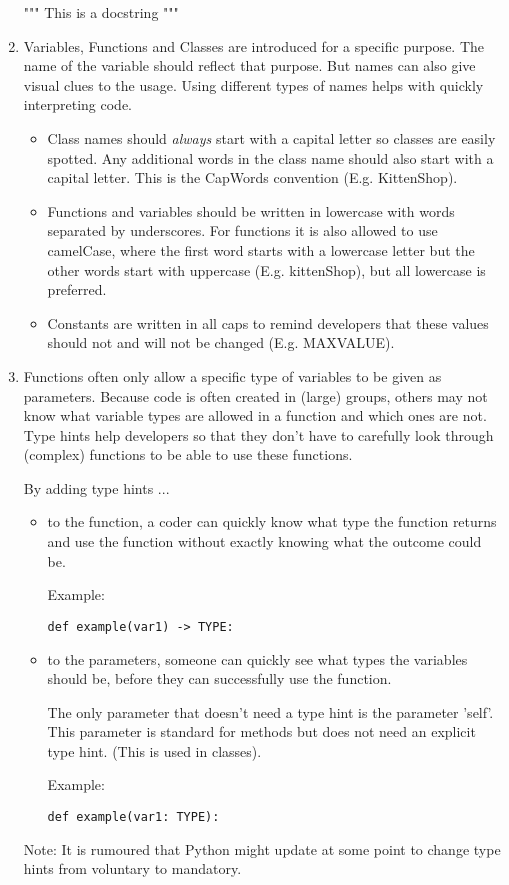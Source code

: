\documentclass[a4paper,11pt]{article}
\begin{document}
\begin{enumerate}
  """ This is a docstring """

\item Variables, Functions and Classes are introduced for a specific purpose.
  The name of the variable should reflect that purpose.
  But names can also give visual clues to the usage. 
  Using different types of names helps with quickly interpreting code.
  \begin{itemize}
      \item Class names should \emph{always} start with a capital letter so classes are easily spotted. Any additional words in the class name should also start with a capital letter. This is the CapWords convention (E.g. KittenShop).
      \item Functions and variables should be written in lowercase with words separated by underscores. 
      For functions it is also allowed to use camelCase, where the first word starts with a lowercase letter but the other words start with uppercase (E.g. kittenShop), but all lowercase is preferred.
      \item Constants are written in all caps to remind developers that these values should not and will not be changed (E.g. MAXVALUE).
  \end{itemize}
  
  

\item Functions often only allow a specific type of variables 
  to be given as parameters.
  Because code is often created in (large) groups, others may not know what variable types are allowed in a function and which ones are not.
  Type hints help developers so that they don't have to carefully look through (complex) functions to be able to use these functions.
  
  By adding type hints ...
  \begin{itemize}
      \item to the function, a coder can quickly know what type the function returns and use the function without exactly knowing what the outcome could be.
      
      Example: \begin{lstlisting}[numbers=none]
      def example(var1) -> TYPE:
      \end{lstlisting}
      \item to the parameters, someone can quickly see what types the variables should be, before they can successfully use the function.
      
      The only parameter that doesn't need a type hint is the parameter 'self'. This parameter is standard for methods but does not need an explicit type hint. (This is used in classes).
      
      Example: \begin{lstlisting}[numbers=none]
      def example(var1: TYPE):
      \end{lstlisting}
  \end{itemize}
  Note: It is rumoured that Python might update at some point to change type hints from voluntary to mandatory.


\end{enumerate}
\end{document}
